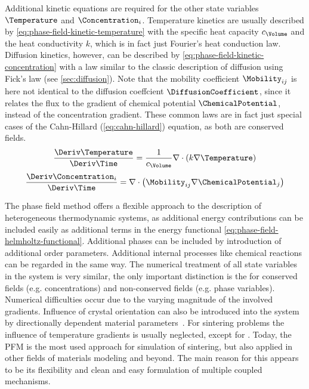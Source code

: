 Additional kinetic equations are required for the other state variables $\Temperature$ and $\Concentration_i$.
Temperature kinetics are usually described by \cref{eq:phase-field-kinetic-temperature} with the specific heat capacity $c_\Volume$ and the heat conductivity $k$, which is in fact just Fourier's heat conduction law.
Diffusion kinetics, however, can be described by \cref{eq:phase-field-kinetic-concentration} with a law similar to the classic description of diffusion using Fick's law (see \cref{sec:diffusion}).
Note that the mobility coefficient $\Mobility_{ij}$ is here not identical to the diffusion coeffcient $\DiffusionCoefficient$, since it relates the flux to the gradient of chemical potential $\ChemicalPotential$, instead of the concentration gradient.
These common laws are in fact just special cases of the Cahn-Hillard (\cref{eq:cahn-hillard}) equation, as both are conserved fields.
\begin{equation}
    \frac{\Deriv\Temperature}{\Deriv \Time} = \frac{1}{c_\Volume} \nabla \cdot \left( k \nabla \Temperature \right)
    \label{eq:phase-field-kinetic-temperature}
\end{equation}
\begin{equation}
    \frac{\Deriv\Concentration_i}{\Deriv \Time} = \nabla \cdot \left( \Mobility_{ij} \nabla \ChemicalPotential_j \right)
    \label{eq:phase-field-kinetic-concentration}
\end{equation}

The phase field method offers a flexible approach to the description of heterogeneous thermodynamic systems, as additional energy contributions can be included easily as additional terms in the energy functional \cref{eq:phase-field-helmholtz-functional}.
Additional phases can be included by introduction of additional order parameters.
Additional internal processes like chemical reactions can be regarded in the same way.
The numerical treatment of all state variables in the system is very similar, the only important distinction is the for conserved fields (e.g. concentrations) and non-conserved fields (e.g. phase variables).
Numerical difficulties occur due to the varying magnitude of the involved gradients.
Influence of crystal orientation can also be introduced into the system by directionally dependent material parameters~\cite{Deng2012}.
For sintering problems the influence of temperature gradients is usually neglected, except for \textcite{Yang2020}.
Today, the \gls{PFM} is the most used approach for simulation of sintering, but also applied in other fields of materials modeling and beyond.
The main reason for this appears to be its flexibility and clean and easy formulation of multiple coupled mechanisms.

